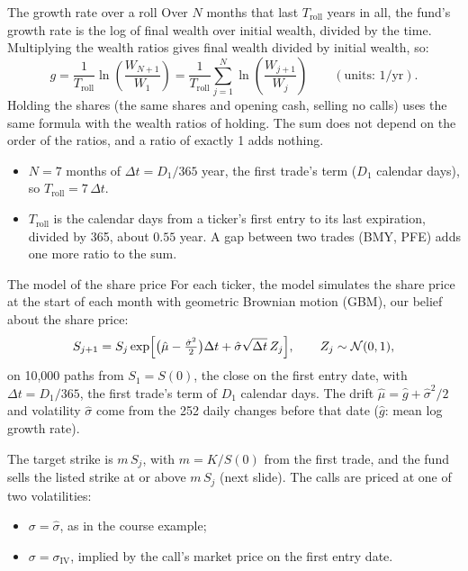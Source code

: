 \documentclass[aspectratio=169,11pt]{beamer}
\begin{document}
\begin{frame}{The growth rate over a roll}
Over $N$ months that last $T_{\text{roll}}$ years in all, the fund's growth rate
is the log of final wealth over initial wealth, divided by the time. Multiplying
the wealth ratios gives final wealth divided by initial wealth, so:
\[
 g=\frac{1}{T_{\text{roll}}}\ln\left(\frac{W_{N+1}}{W_1}\right)
 =\frac{1}{T_{\text{roll}}}\sum_{j=1}^{N}\ln\left(\frac{W_{j+1}}{W_j}\right)
 \qquad(\text{units: }1/\text{yr}).
\]
Holding the shares (the same shares and opening cash, selling no calls) uses
the same formula with the wealth ratios of holding. The sum
does not depend on the order of the ratios, and a ratio of exactly 1 adds nothing.

\vspace{0.5em}
\begin{itemize}\setlength{\itemsep}{0.3em}
\item {} $N=7$ months of $\Delta t=D_1/365$ year, the
first trade's term ($D_1$ calendar days), so $T_{\text{roll}}=7\,\Delta t$.
\item {} $T_{\text{roll}}$ is the calendar days from a
ticker's first entry to its last expiration, divided by 365, about $0.55$ year.
A gap between two trades (BMY, PFE) adds one more ratio to the sum.
\end{itemize}
\end{frame}

\begin{frame}{The model of the share price}
For each ticker, the model simulates the share price at the start of each
month with geometric Brownian motion (GBM), our belief about the share price:
\[
 S_{j+1}=S_j\exp\Bigl[\bigl(\hat\mu-\tfrac{\hat\sigma^{2}}{2}\bigr)\Delta t
 +\hat\sigma\sqrt{\Delta t}\,Z_j\Bigr],\qquad Z_j\sim\mathcal{N}(0,1),
\]
on 10,000 paths from $S_1=S(0)$, the close on the first entry date, with
$\Delta t=D_1/365$, the first trade's term of $D_1$ calendar days. The drift
$\hat\mu=\hat g+\hat\sigma^{2}/2$ and volatility $\hat\sigma$ come from the
252 daily changes before that date ($\hat g$: mean log growth rate).

\vspace{0.3em}
The target strike is $m\,S_j$, with $m=K/S(0)$ from the first trade, and the
fund sells the listed strike at or above $m\,S_j$ (next slide). The calls are priced
at one of two volatilities:
\begin{itemize}\setlength{\itemsep}{0.1em}
\item {} $\sigma=\hat\sigma$, as in the course example;
\item {} $\sigma=\sigma_{\text{IV}}$, implied by the call's
market price on the first entry date.
\end{itemize}
\end{frame}
\end{document}
